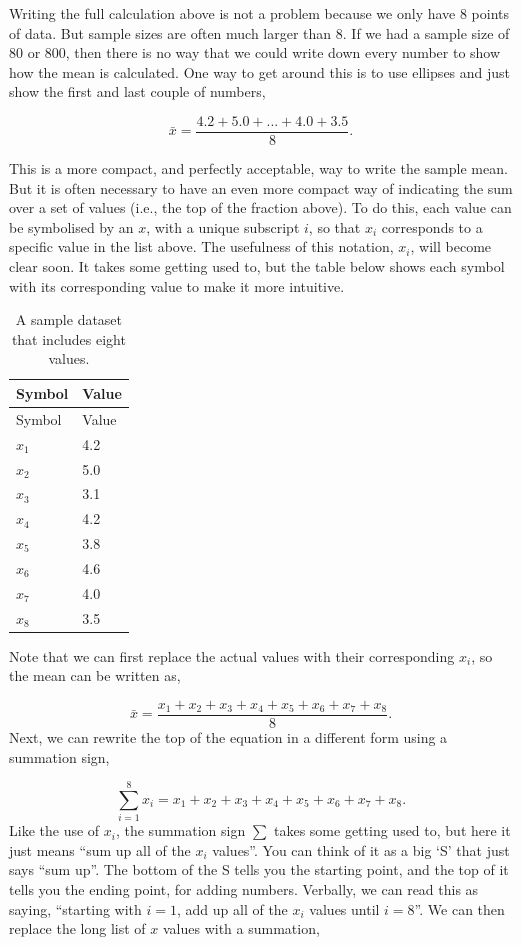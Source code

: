 \documentclass[
]{scrbook}
\begin{document}
Writing the full calculation above is not a problem because we only have 8 points of data.
But sample sizes are often much larger than 8.
If we had a sample size of 80 or 800, then there is no way that we could write down every number to show how the mean is calculated.
One way to get around this is to use ellipses and just show the first and last couple of numbers,

\[\bar{x} = \frac{4.2 + 5.0 + ... + 4.0 + 3.5}{8}.\]

This is a more compact, and perfectly acceptable, way to write the sample mean.
But it is often necessary to have an even more compact way of indicating the sum over a set of values (i.e., the top of the fraction above).
To do this, each value can be symbolised by an \(x\), with a unique subscript \(i\), so that \(x_{i}\) corresponds to a specific value in the list above.
The usefulness of this notation, \(x_{i}\), will become clear soon.
It takes some getting used to, but the table below shows each symbol with its corresponding value to make it more intuitive.

\begin{longtable}[]{@{}ll@{}}
\caption{A sample dataset that includes eight values.}\tabularnewline
\toprule
Symbol & Value \\
\midrule
\endfirsthead
\toprule
Symbol & Value \\
\midrule
\endhead
\(x_{1}\) & 4.2 \\
\(x_{2}\) & 5.0 \\
\(x_{3}\) & 3.1 \\
\(x_{4}\) & 4.2 \\
\(x_{5}\) & 3.8 \\
\(x_{6}\) & 4.6 \\
\(x_{7}\) & 4.0 \\
\(x_{8}\) & 3.5 \\
\bottomrule
\end{longtable}

Note that we can first replace the actual values with their corresponding \(x_{i}\), so the mean can be written as,

\[\bar{x} = \frac{x_{1} + x_{2} + x_{3} + x_{4} + x_{5} + x_{6} + x_{7} + x_{8}}{8}.\]
Next, we can rewrite the top of the equation in a different form using a summation sign,

\[\sum_{i = 1}^{8}x_{i} = x_{1} + x_{2} + x_{3} + x_{4} + x_{5} + x_{6} + x_{7} + x_{8}.\]
Like the use of \(x_{i}\), the summation sign \(\sum\) takes some getting used to, but here it just means ``sum up all of the \(x_{i}\) values''.
You can think of it as a big `S' that just says ``sum up''.
The bottom of the S tells you the starting point, and the top of it tells you the ending point, for adding numbers.
Verbally, we can read this as saying, ``starting with \(i = 1\), add up all of the \(x_{i}\) values until \(i = 8\)''.
We can then replace the long list of \(x\) values with a summation,
\end{document}
